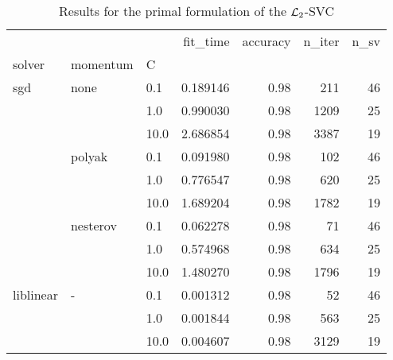 \begin{table}[H]
\centering
\caption{Results for the primal formulation of the $\protect \mathcal{L}_2$-SVC}
\label{primal_l2_svc_cv_results}
\begin{tabular}{lllrrrr}
\toprule
          &   &      &  fit\_time &  accuracy &  n\_iter &  n\_sv \\
solver & momentum & C &           &           &         &       \\
\midrule
sgd & none & 0.1  &  0.189146 &      0.98 &     211 &    46 \\
          &   & 1.0  &  0.990030 &      0.98 &    1209 &    25 \\
          &   & 10.0 &  2.686854 &      0.98 &    3387 &    19 \\
          & polyak & 0.1  &  0.091980 &      0.98 &     102 &    46 \\
          &   & 1.0  &  0.776547 &      0.98 &     620 &    25 \\
          &   & 10.0 &  1.689204 &      0.98 &    1782 &    19 \\
          & nesterov & 0.1  &  0.062278 &      0.98 &      71 &    46 \\
          &   & 1.0  &  0.574968 &      0.98 &     634 &    25 \\
          &   & 10.0 &  1.480270 &      0.98 &    1796 &    19 \\
liblinear & - & 0.1  &  0.001312 &      0.98 &      52 &    46 \\
          &   & 1.0  &  0.001844 &      0.98 &     563 &    25 \\
          &   & 10.0 &  0.004607 &      0.98 &    3129 &    19 \\
\bottomrule
\end{tabular}
\end{table}

